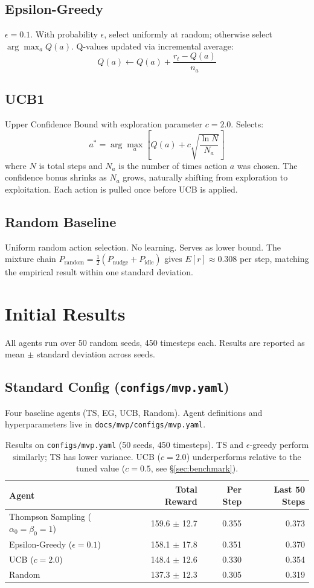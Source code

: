 \documentclass[11pt]{article}
\begin{document}
\subsection{Epsilon-Greedy}
$\epsilon = 0.1$. With probability $\epsilon$, select uniformly at random; otherwise select $\arg\max_a Q(a)$. Q-values updated via incremental average:
\[
Q(a) \leftarrow Q(a) + \frac{r_t - Q(a)}{n_a}
\]

\subsection{UCB1}
Upper Confidence Bound with exploration parameter $c = 2.0$. Selects:
\[
a^* = \arg\max_a \left[ Q(a) + c \sqrt{\frac{\ln N}{N_a}} \right]
\]
where $N$ is total steps and $N_a$ is the number of times action $a$ was chosen. The confidence bonus shrinks as $N_a$ grows, naturally shifting from exploration to exploitation. Each action is pulled once before UCB is applied.

\subsection{Random Baseline}
Uniform random action selection. No learning. Serves as lower bound.
The mixture chain $P_{\text{random}} = \tfrac{1}{2}(P_{\text{nudge}} + P_{\text{idle}})$ gives $E[r] \approx 0.308$ per step, matching the empirical result within one standard deviation.

\section{Initial Results}

All agents run over 50 random seeds, 450 timesteps each. Results are reported as mean $\pm$ standard deviation across seeds.

\subsection{Standard Config (\texttt{configs/mvp.yaml})}
Four baseline agents (TS, EG, UCB, Random). Agent definitions and hyperparameters live in \texttt{docs/mvp/configs/mvp.yaml}.

\begin{table}[h]
\centering
\begin{tabular}{lrrr}
\toprule
Agent & Total Reward & Per Step & Last 50 Steps \\
\midrule
Thompson Sampling ($\alpha_0=\beta_0=1$) & 159.6 $\pm$ 12.7 & 0.355 & 0.373 \\
Epsilon-Greedy ($\epsilon=0.1$) & 158.1 $\pm$ 17.8 & 0.351 & 0.370 \\
UCB ($c=2.0$) & 148.4 $\pm$ 12.6 & 0.330 & 0.354 \\
Random & 137.3 $\pm$ 12.3 & 0.305 & 0.319 \\
\bottomrule
\end{tabular}
\caption{Results on \texttt{configs/mvp.yaml} (50 seeds, 450 timesteps). TS and $\epsilon$-greedy perform similarly; TS has lower variance. UCB ($c=2.0$) underperforms relative to the tuned value ($c=0.5$, see \S\ref{sec:benchmark}).}
\end{table}
\end{document}
